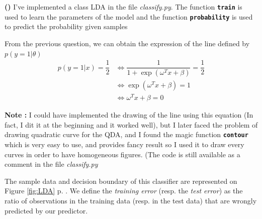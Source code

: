 \documentclass[a4paper, 11pt]{article}
\newcounter{cquestion}[subsection]
\renewcommand{\thecquestion}{\alph{cquestion}}
\newenvironment{question}
{\par \vspace{0.5em} \noindent \stepcounter{cquestion} \hspace{-1em}
 \textbf{(\thecquestion)}}
{}
\newenvironment{note}
{\begin{framed} \textbf{Note : }}
{\end{framed}}
\newcommand{\file}[1]{\emph{#1}}
\newcommand{\Figure}[1]{Figure \ref{#1} p. \pageref{#1}}
\newcommand{\pfun}[1]{{\textbf{\texttt{#1}}}}
\begin{document}
\begin{question}
  I've implemented a class LDA in the file \file{classify.py}.
  The function \pfun{train} is used to learn the parameters of
  the model and the function \pfun{probability} is used to predict
  the probability given samples







  From the previous question, we can obtain the expression of the
  line defined by $p(y = 1 | \theta)$
  \begin{align*}
    p(y = 1 | x) = \dfrac{1}{2} & \Leftrightarrow \dfrac{1}{1 + \exp{(\omega^T x + \beta)}} = \dfrac{1}{2} \\
    & \Leftrightarrow \exp{(\omega^T x + \beta)} = 1 \\
    & \Leftrightarrow \omega^T x + \beta = 0
  \end{align*}

  \begin{note}
    I could have implemented the drawing of the line using this
    equation (In fact, I dit it at the beginning and it worked
    well), but I later faced the problem of drawing quadratic
    curve for the QDA, and I found the magic function \pfun{contour}
    which is very easy to use, and provides fancy result so I used it
    to draw every curves in order to have homogeneous figures. (The code
    is still available as a comment in the file \file{classify.py}
  \end{note}

  The sample data and decision boundary of this classifier are
  represented on \Figure{fig:LDA}.  We define the
  \emph{training error} (resp. the \emph{test error}) as the ratio
  of observations in the training data (resp. in the test data) that
  are wrongly predicted by our predictor.


\end{question}
\end{document}
